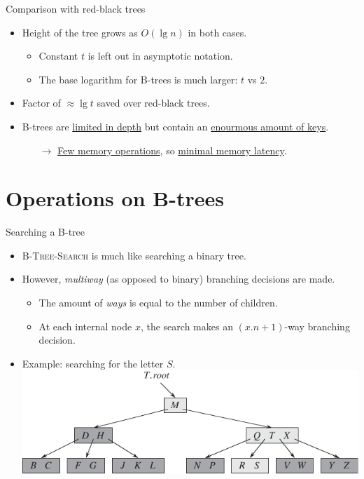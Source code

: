 \documentclass[11pt,t]{beamer}
\begin{document}
	\begin{frame}{Comparison with red-black trees}
		\begin{itemize}[<+->]
			\item Height of the tree grows as \(O(\lg n)\) in both cases.
			\begin{itemize}[<+->]
				\item Constant \(t\) is left out in asymptotic notation.
				\item The base logarithm for B-trees is much larger: \(t\) vs \(2\).
			\end{itemize}
			\item Factor of \(\approx \lg t\) saved over red-black trees.
			\item B-trees are \underline{limited in depth} but contain an \underline{enourmous amount of keys}.
			\begin{itemize}
				\item[\(\rightarrow\)] \underline{Few memory operations}, so \underline{minimal memory latency}.
			\end{itemize}
		\end{itemize}
	\end{frame}

	\section{Operations on B-trees}

	\begin{frame}{Searching a B-tree}
		\begin{itemize}[<+->]
			\item \textsc{B-Tree-Search} is much like searching a binary tree.
			\item However, \textit{multiway} (as opposed to binary) branching decisions are made.
			\begin{itemize}[<+->]
				\item The amount of \textit{ways} is equal to the number of children.
				\item At each internal node \(x\), the search makes an \((x.n+1)\)-way branching decision.
			\end{itemize}
			\item Example: searching for the letter \(S\). \vspace{0.2cm}\\
			\centering
			\hspace{1cm}\includegraphics{images/letters}
		\end{itemize}
	\end{frame}
\end{document}
